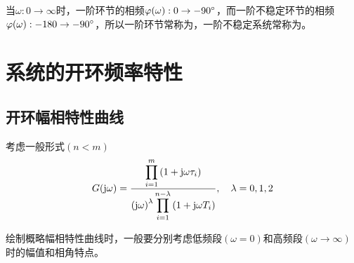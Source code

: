 \begin{enumerate}[1.]
\begin{enumerate}[(1) ]
		当$\omega: 0 \to \infty$时，一阶环节的相频$\varphi(\omega ): 0 \to -90{}^{\circ}$，而一阶不稳定环节的相频$\varphi(\omega ): -180 \to -90{}^{\circ}$，所以一阶环节常称为，一阶不稳定系统常称为。
	\end{enumerate}
\end{enumerate}

\vspace*{-1em}
\warn[
{
\begin{enumerate}[1. ]
	\item 对最小相位系统，传递函数可由幅频特性曲线唯一确定；但非最小相位系统的传递函数则不能仅由幅频特性曲线决定。\vspace*{-0.5em}
	
	\item 对具有相同幅频特性的系统，最小相位系统的相角变化范围是最小的。\vspace*{-0.5em}
	
	\item 在计算角度时，设所有的环节都满足$0\degree \le \theta \le 180 \degree$，则 $\arctan(-T\omega) = 180 \degree - \arctan(T \omega)$，对于非最小相位环节需要做这个处理。
\end{enumerate}
}
]

\section{系统的开环频率特性}

\subsection{开环幅相特性曲线}

考虑一般形式$(n < m)$
\begin{align}
	G(\text{j} \omega) = \dfrac{\displaystyle \prod_{i=1}^{m} \left(1 + \text{j} \omega \tau_i \right)}{\displaystyle \left(\text{j} \omega\right)^{\lambda} \prod_{i=1}^{n - \lambda} \left(1 + \text{j} \omega T_i \right) }, \quad \lambda = 0,1,2
\end{align}

绘制概略幅相特性曲线时，一般要分别考虑低频段$(\omega = 0)$和高频段$(\omega \to \infty)$时的幅值和相角特点。

